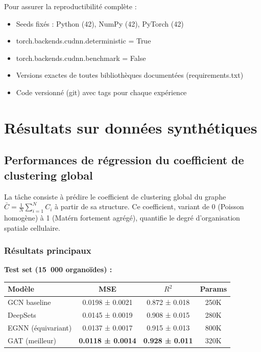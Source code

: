 Pour assurer la reproductibilité complète :
\begin{itemize}
    \item Seeds fixés : Python (42), NumPy (42), PyTorch (42)
    \item torch.backends.cudnn.deterministic = True
    \item torch.backends.cudnn.benchmark = False
    \item Versions exactes de toutes bibliothèques documentées (requirements.txt)
    \item Code versionné (git) avec tags pour chaque expérience
\end{itemize}


\section{Résultats sur données synthétiques}

\subsection{Performances de régression du coefficient de clustering global}

La tâche consiste à prédire le coefficient de clustering global du graphe $\bar{C} = \frac{1}{N}\sum_{i=1}^N C_i$ à partir de sa structure. Ce coefficient, variant de 0 (Poisson homogène) à 1 (Matérn fortement agrégé), quantifie le degré d'organisation spatiale cellulaire.

\subsubsection{Résultats principaux}

\textbf{Test set (15~000 organoïdes) :}

\begin{center}
\begin{tabular}{|l|c|c|c|}
\hline
\textbf{Modèle} & \textbf{MSE} & \textbf{$R^2$} & \textbf{Params} \\
\hline
GCN baseline & 0.0198 ± 0.0021 & 0.872 ± 0.018 & 250K \\
DeepSets & 0.0145 ± 0.0019 & 0.908 ± 0.015 & 280K \\
EGNN (équivariant) & 0.0137 ± 0.0017 & 0.915 ± 0.013 & 800K \\
GAT (meilleur) & \textbf{0.0118 ± 0.0014} & \textbf{0.928 ± 0.011} & 320K \\
\hline
\end{tabular}
\end{center}

